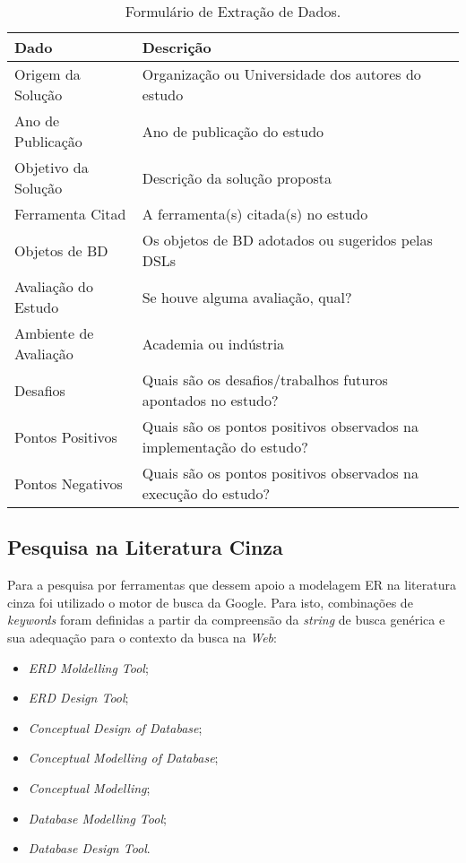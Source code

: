 \begin{table}[!htb]
    \centering
    \small
    \caption{Formulário de Extração de Dados.}
    \label{tab:DataExtractionForm}
    \begin{tabular}{l|p{11cm}}
    \bottomrule
    \rowcolor[HTML]{C0C0C0} 
    \textbf{Dado} & \textbf{Descrição} \\
    \hline
    Origem da Solução & Organização ou Universidade dos autores do estudo
    \\
    Ano de Publicação & Ano de publicação do estudo
    \\
    Objetivo da Solução & Descrição da solução proposta
    \\
    Ferramenta Citad & A ferramenta(s) citada(s) no estudo
    \\
    Objetos de \ac{BD} & Os objetos de \ac{BD} adotados ou sugeridos pelas \acp{DSL}
    \\
    Avaliação do Estudo & Se houve alguma avaliação, qual?
    \\
    Ambiente de Avaliação & Academia ou indústria
    \\
    Desafios & Quais são os desafios/trabalhos futuros apontados no estudo?
    \\
    Pontos Positivos & Quais são os pontos positivos observados na implementação do estudo?
    \\
    Pontos Negativos & Quais são os pontos positivos observados na execução do estudo?
    \\
    \toprule
    \end{tabular}
\end{table}

\subsection{Pesquisa na Literatura Cinza} \label{sec:ExecMapeamento}

Para a pesquisa por ferramentas que dessem apoio a modelagem ER na literatura cinza foi utilizado o motor de busca da Google. 
Para isto, combinações de \textit{keywords} foram definidas a partir da compreensão da \textit{string} de busca genérica e sua adequação para o contexto da busca na \textit{Web}: 

\begin{itemize}
    \item \textit{ERD Moldelling Tool}; 
    \item \textit{ERD Design Tool}; 
    \item \textit{Conceptual Design of Database}; 
    \item \textit{Conceptual Modelling of Database}; 
    \item \textit{Conceptual Modelling}; 
    \item \textit{Database Modelling Tool}; 
    \item \textit{Database Design Tool}.
\end{itemize} 

